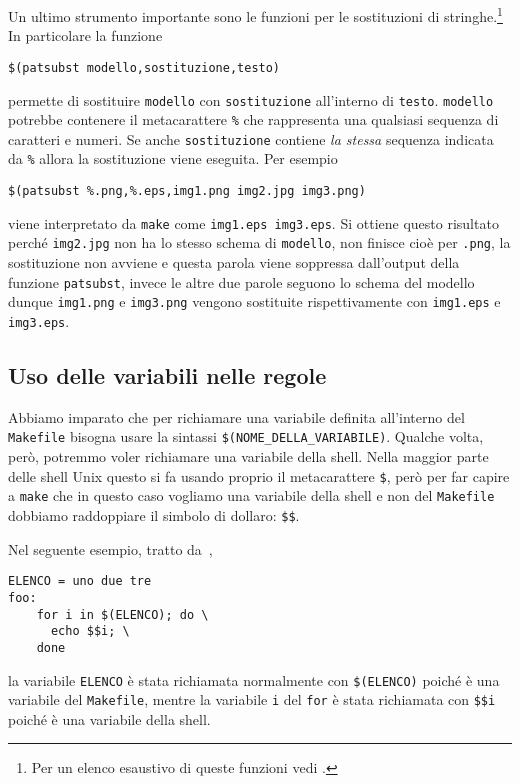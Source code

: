 Un ultimo strumento importante sono le funzioni per le sostituzioni di
stringhe.\footnote{Per un elenco esaustivo di queste funzioni vedi
  \textcite[80]{gnu:make}.}  In particolare la funzione
\begin{lstlisting}
$(patsubst modello,sostituzione,testo)
\end{lstlisting} %
permette di sostituire \texttt{modello} con \texttt{sostituzione} all'interno di
\texttt{testo}.  \texttt{modello} potrebbe contenere il metacarattere
\texttt{\%} che rappresenta una qualsiasi sequenza di caratteri e numeri.  Se
anche \texttt{sostituzione} contiene \emph{la stessa} sequenza indicata da
\texttt{\%} allora la sostituzione viene eseguita.  Per esempio
\begin{lstlisting}
$(patsubst %.png,%.eps,img1.png img2.jpg img3.png)
\end{lstlisting} %
viene interpretato da \texttt{make} come \texttt{img1.eps img3.eps}.  Si ottiene
questo risultato perché \texttt{img2.jpg} non ha lo stesso schema di
\texttt{modello}, non finisce cioè per \texttt{.png}, la sostituzione non
avviene e questa parola viene soppressa dall'output della funzione
\texttt{patsubst}, invece le altre due parole seguono lo schema del modello
dunque \texttt{img1.png} e \texttt{img3.png} vengono sostituite rispettivamente
con \texttt{img1.eps} e \texttt{img3.eps}.

\subsection{Uso delle variabili nelle regole}
\label{sec:uso-variabili}

Abbiamo imparato che per richiamare una variabile definita all'interno del
\texttt{Makefile} bisogna usare la sintassi \texttt{\$(NOME\_DELLA\_VARIABILE)}.
Qualche volta, però, potremmo voler richiamare una variabile della shell.  Nella
maggior parte delle shell Unix questo si fa usando proprio il metacarattere
\texttt{\$}, però per far capire a \texttt{make} che in questo caso vogliamo una
variabile della shell e non del \texttt{Makefile} dobbiamo raddoppiare il
simbolo di dollaro: \texttt{\$\$}.

Nel seguente esempio, tratto da~\textcite[43]{gnu:make},
\begin{lstlisting}
ELENCO = uno due tre
foo:
	for i in $(ELENCO); do \
	  echo $$i; \
	done
\end{lstlisting}
la variabile \texttt{ELENCO} è stata richiamata normalmente con
\texttt{\$(ELENCO)} poiché è una variabile del \texttt{Makefile}, mentre la
variabile \texttt{i} del \texttt{for} è stata richiamata con \texttt{\$\$i}
poiché è una variabile della shell.

